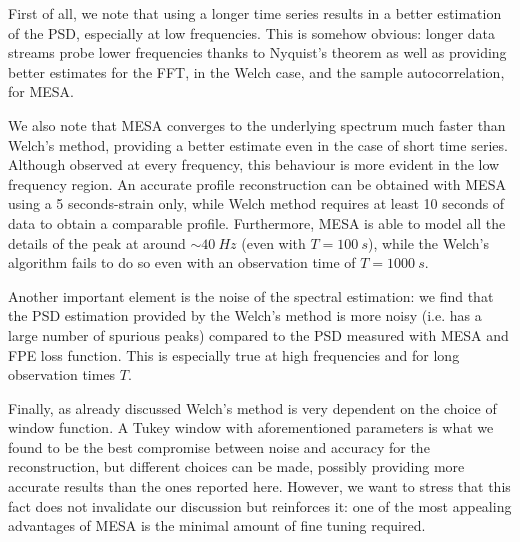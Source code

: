 \documentclass[twocolumn,showpacs,preprintnumbers,nofootinbib,prd,
superscriptaddress,10pt]{revtex4-1}
\begin{document}
First of all, we note that using a longer time series results in a better estimation of the PSD, especially at low frequencies. 
This is somehow obvious: longer data streams probe lower frequencies thanks to Nyquist's theorem as well as providing better estimates for the FFT, in the Welch case, and the sample autocorrelation, for MESA.

We also note that MESA converges to the underlying spectrum much faster than Welch's method, providing a better estimate even in the case of short time series. Although observed at every frequency, this behaviour is more evident in the low frequency region. An accurate profile reconstruction can be obtained with MESA using a 5 seconds-strain only, while Welch method requires at least 10 seconds of data to obtain a comparable profile.
Furthermore, MESA is able to model all the details of the peak at around $\sim \SI{40}{Hz}$ (even with $T=\SI{100}{s}$), while the Welch's algorithm fails to do so even with an observation time of $T=\SI{1000}{s}$.

Another important element is the noise of the spectral estimation: we find that the PSD estimation provided by the Welch's method is more noisy (i.e. has a large number of spurious peaks) compared to the PSD measured with MESA and FPE loss function. This is especially true at high frequencies and for long observation times $T$.

Finally, as already discussed Welch's method is very dependent on the choice of window function. 
A Tukey window with aforementioned parameters is what we found to be the best compromise between noise 
and accuracy for the reconstruction, but different choices can be made, possibly providing more accurate results than the ones reported here. 
However, we want to stress that this fact does not invalidate our discussion but reinforces it: one of the most appealing advantages of MESA is the minimal amount of fine tuning required.
\end{document}
